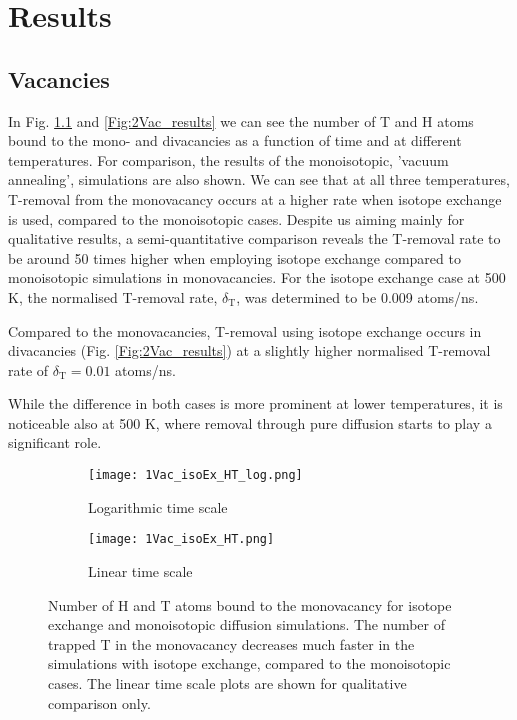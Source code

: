 \chapter{Results}

\section{Vacancies}
\label{Section:Vac_results}
In Fig. \ref{Fig:1Vac_results} and \ref{Fig:2Vac_results} we can see the number of T and H atoms bound to the mono- and divacancies as a function of time and at different temperatures. 
For comparison, the results of the monoisotopic, 'vacuum annealing', simulations are also shown. 
We can see that at all three temperatures, T-removal from the monovacancy occurs at a higher rate when isotope exchange is used, compared to the monoisotopic cases.
Despite us aiming mainly for qualitative results, a semi-quantitative comparison reveals the T-removal rate to be around 50 times higher when employing isotope exchange compared to monoisotopic simulations in monovacancies. 
For the isotope exchange case at 500 K, the normalised T-removal rate, $\delta_{\text{T}}$, was determined to be 0.009 atoms/ns.

Compared to the monovacancies, T-removal using isotope exchange occurs in divacancies (Fig. \ref{Fig:2Vac_results}) at a slightly higher normalised T-removal rate of $\delta_{\text{T}} = 0.01$ atoms/ns.

While the difference in both cases is more prominent at lower temperatures, it is noticeable also at 500 K, where removal through pure diffusion starts to play a significant role.

\begin{figure}[!ht]
\begin{subfigure}{.5\textwidth}
  \centering
  \texttt{[image: 1Vac\_isoEx\_HT\_log.png]}  
  \caption{Logarithmic time scale}
\end{subfigure}
\begin{subfigure}{.5\textwidth}
  \centering
  \texttt{[image: 1Vac\_isoEx\_HT.png]}  
  \caption{Linear time scale}
\end{subfigure}
\caption{Number of H and T atoms bound to the monovacancy for isotope exchange and monoisotopic diffusion simulations. The number of trapped T in the monovacancy decreases much faster in the simulations with isotope exchange, compared to the monoisotopic cases. The linear time scale plots are shown for qualitative comparison only.}
 \label{Fig:1Vac_results} 
\end{figure}



